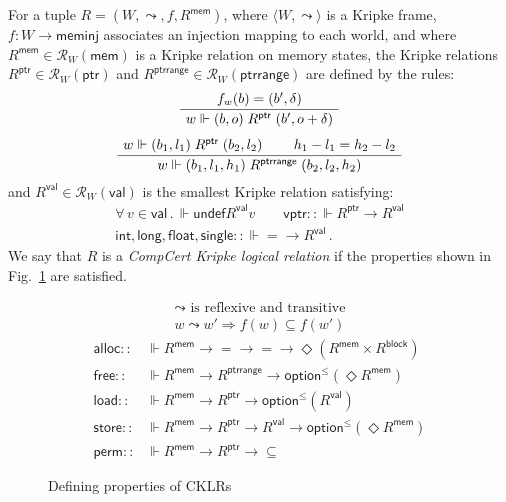 \documentclass[sigplan,10pt,review,anonymous]{acmart}
\newcommand{\kw}[1]{\ensuremath{ \mathsf{#1} }}
\begin{document}
\begin{definition} \label{def:cklr} %
For a tuple $R = (W, \leadsto, f, R^\kw{mem})$,
where
$\langle W, \leadsto \rangle$ is a Kripke frame,
$f : W \rightarrow \kw{meminj}$
associates an injection mapping to each world, and where
$R^\kw{mem} \in \mathcal{R}_{W}(\kw{mem})$
is a Kripke relation on memory states,
the Kripke relations
$R^\kw{ptr} \in \mathcal{R}_W(\kw{ptr})$ and
$R^\kw{ptrrange} \in \mathcal{R}_W(\kw{ptrrange})$
are defined by the rules:
\begin{gather*}
  \AxiomC{$f_w(b) = (b', \delta)$}
  \UnaryInfC{$w \Vdash (b, o) \mathrel{R^\kw{ptr}} (b', o + \delta)$}
  \DisplayProof
  \\[1ex]
  \AxiomC{$w \Vdash (b_1, l_1) \mathrel{R^\kw{ptr}} (b_2, l_2)$}
  \AxiomC{$h_1 - l_1 = h_2 - l_2$}
  \BinaryInfC{$w \Vdash (b_1, l_1, h_1) \mathrel{R^\kw{ptrrange}} (b_2, l_2, h_2)$}
  \DisplayProof
\end{gather*}
and
$R^\kw{val} \in \mathcal{R}_W(\kw{val})$
is the smallest Kripke relation satisfying:
\begin{gather*}
  \forall \, v \in \kw{val} \,.\,
    \Vdash \kw{undef} \mathrel{R^\kw{val}} v \qquad
  \kw{vptr} :: {\Vdash R^\kw{ptr} \rightarrow R^\kw{val}} \\
  \kw{int}, \kw{long}, \kw{float}, \kw{single} ::
    {\Vdash {=} \rightarrow R^\kw{val}} \,.
\end{gather*}
We say that $R$ is a \emph{CompCert Kripke logical relation}
if the properties shown in Fig.~\ref{fig:cklr-def} are satisfied.
\end{definition}

\begin{figure} %
  \begin{gather*}
    {\leadsto} \mbox{ is reflexive and transitive} \\
    w \leadsto w' \Rightarrow f(w) \subseteq f(w')
  \end{gather*}
  \begin{align*}
      \kw{alloc} ::
        &\Vdash R^\kw{mem} \rightarrow {=} \rightarrow {=} \rightarrow
        \Diamond (R^\kw{mem} \times R^\kw{block})
      \\
      \kw{free} ::
        &\Vdash R^\kw{mem} \rightarrow R^\kw{ptrrange} \rightarrow
        \kw{option}^\le(\Diamond R^\kw{mem})
      \\
      \kw{load} ::
        &\Vdash R^\kw{mem} \rightarrow R^\kw{ptr} \rightarrow
        \kw{option}^\le(R^\kw{val})
      \\
      \kw{store} ::
        &\Vdash R^\kw{mem} \rightarrow R^\kw{ptr} \rightarrow R^\kw{val} \rightarrow
        \kw{option}^\le(\Diamond R^\kw{mem})
      \\
      \kw{perm} ::
        &\Vdash R^\kw{mem} \rightarrow R^\kw{ptr} \rightarrow {\subseteq}
  \end{align*}
  \caption{Defining properties of CKLRs}
  \label{fig:cklr-def}
\end{figure}
\end{document}
